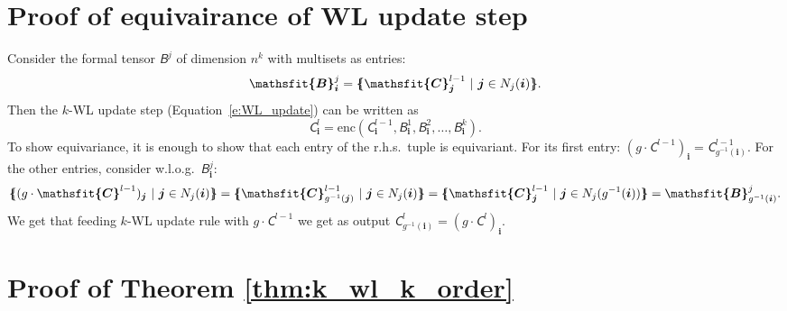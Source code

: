 \documentclass{article}
\newcommand{\mmset}[1]{\{\kern-.4em\{ #1 \}\kern-.4em\}}
\newcommand{\parr}[1]{\left (#1\right )}
\def\Eqref#1{Equation~\ref{#1}}
\def\vi{{\bm{i}}}
\def\vj{{\bm{j}}}
\newcommand{\tens}[1]{\bm{\mathsfit{#1}}}
\def\tB{{\tens{B}}}
\def\tC{{\tens{C}}}
\begin{document}
\section{Proof of equivairance of WL update step}\label{app:thm_equi_wl}
Consider the formal tensor $\tB^j$ of dimension ${n^k}$ with multisets as entries:
\begin{equation}\label{e:Bj}
    \tB^j_\vi = \mmset{\tC^{l-1}_\vj \ \vert\  \vj\in N_j(\vi)}.
\end{equation} Then the $k$-WL update step (\Eqref{e:WL_update}) can be written as 
\begin{equation}\label{e:WL_update_simpler}
    \tC^l_\vi=\mathrm{enc}\parr{\tC^{l-1}_\vi, \tB^1_\vi, \tB^2_\vi,\ldots, \tB^k_\vi}.
\end{equation} To show equivariance, it is enough to show that each entry of the r.h.s.~tuple is equivariant. For its  first entry: $(g\cdot \tC^{l-1})_\vi=\tC^{l-1}_{g^{-1}(\vi)}$. For the other entries, consider w.l.o.g.~$\tB^j_\vi$: 
$$\mmset{(g\cdot\tC^{l-1})_{\vj} \ \vert \ \vj \in N_j(\vi) } = \mmset{\tC^{l-1}_{g^{-1}(\vj)} \ \vert \ \vj \in  N_j(\vi) } = \mmset{\tC^{l-1}_{\vj} \ \vert \ \vj \in N_j(g^{-1}(\vi)) }=\tB^j_{g^{-1}(\vi)}.$$ We get that feeding $k$-WL update rule with  $g\cdot \tC^{l-1}$ we get as output $\tC^l_{g^{-1}(\vi)}=(g\cdot \tC^l)_\vi$. 




\section{Proof of Theorem \ref{thm:k_wl_k_order}}\label{app:thm1}
\end{document}
